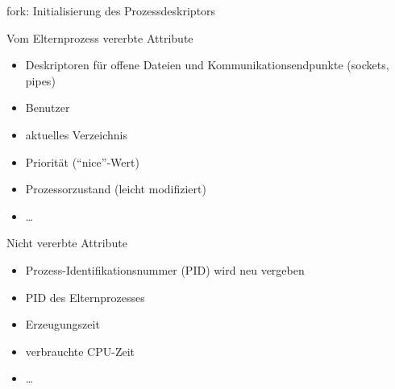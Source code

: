 \documentclass[utf8,9pt]{beamer}
\begin{document}
\begin{frame}{fork: Initialisierung des Prozessdeskriptors}{}

  \begin{block}{Vom Elternprozess vererbte Attribute}
    \begin{itemize}
    \item Deskriptoren für offene Dateien und Kommunikationsendpunkte
      (sockets, pipes)
    \item Benutzer
    \item aktuelles Verzeichnis
    \item Priorität ("`nice"'-Wert)
    \item Prozessorzustand (leicht modifiziert)
    \item \dots
    \end{itemize}
  \end{block}

  \begin{block}{Nicht vererbte Attribute}
    \begin{itemize}
    \item Prozess-Identifikationsnummer (PID) wird neu vergeben
    \item PID des Elternprozesses
    \item Erzeugungszeit
    \item verbrauchte CPU-Zeit
    \item \dots
    \end{itemize}
  \end{block}
\end{frame}
\end{document}
